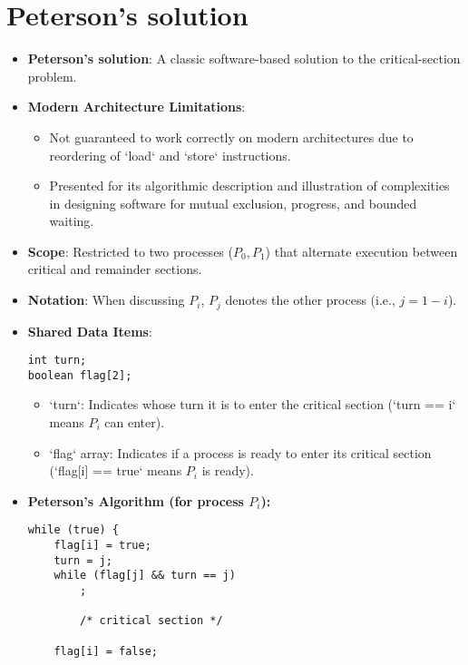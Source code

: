 \section{Peterson's solution}
\begin{itemize}
    \item \textbf{Peterson's solution}: A classic software-based solution to the critical-section problem.
    \item \textbf{Modern Architecture Limitations}:
    \begin{itemize}
        \item Not guaranteed to work correctly on modern architectures due to reordering of `load` and `store` instructions.
        \item Presented for its algorithmic description and illustration of complexities in designing software for mutual exclusion, progress, and bounded waiting.
    \end{itemize}
    \item \textbf{Scope}: Restricted to two processes ($P_0, P_1$) that alternate execution between critical and remainder sections.
    \item \textbf{Notation}: When discussing $P_i$, $P_j$ denotes the other process (i.e., $j = 1 - i$).
    \item \textbf{Shared Data Items}:
\begin{verbatim}
int turn;
boolean flag[2];
\end{verbatim}
    \begin{itemize}
        \item `turn`: Indicates whose turn it is to enter the critical section (`turn == i` means $P_i$ can enter).
        \item `flag` array: Indicates if a process is ready to enter its critical section (`flag[i] == true` means $P_i$ is ready).
    \end{itemize}
    \item \textbf{Peterson's Algorithm (for process $P_i$):}
\begin{verbatim}
while (true) {
    flag[i] = true;
    turn = j;
    while (flag[j] && turn == j)
        ;
 
        /* critical section */
 
    flag[i] = false;
 

\end{verbatim}
\end{itemize}
